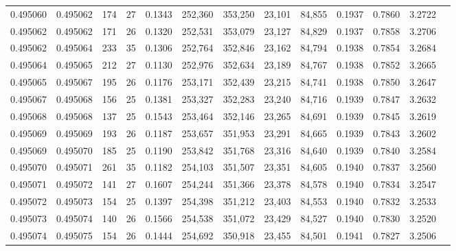\begin{tabular}{rrrrrrrrrrrrr}
0.495060 & 0.495062 & 174 &  27 &                                     0.1343 & 252,360 & 353,250 &  23,101 &  84,855 & 0.1937 & 0.7860 & 3.2722 \\
0.495062 & 0.495062 & 171 &  26 &                                     0.1320 & 252,531 & 353,079 &  23,127 &  84,829 & 0.1937 & 0.7858 & 3.2706 \\
0.495062 & 0.495064 & 233 &  35 &                                     0.1306 & 252,764 & 352,846 &  23,162 &  84,794 & 0.1938 & 0.7854 & 3.2684 \\
0.495064 & 0.495065 & 212 &  27 &                                     0.1130 & 252,976 & 352,634 &  23,189 &  84,767 & 0.1938 & 0.7852 & 3.2665 \\
0.495065 & 0.495067 & 195 &  26 &                                     0.1176 & 253,171 & 352,439 &  23,215 &  84,741 & 0.1938 & 0.7850 & 3.2647 \\
0.495067 & 0.495068 & 156 &  25 &                                     0.1381 & 253,327 & 352,283 &  23,240 &  84,716 & 0.1939 & 0.7847 & 3.2632 \\
0.495068 & 0.495068 & 137 &  25 &                                     0.1543 & 253,464 & 352,146 &  23,265 &  84,691 & 0.1939 & 0.7845 & 3.2619 \\
0.495069 & 0.495069 & 193 &  26 &                                     0.1187 & 253,657 & 351,953 &  23,291 &  84,665 & 0.1939 & 0.7843 & 3.2602 \\
0.495069 & 0.495070 & 185 &  25 &                                     0.1190 & 253,842 & 351,768 &  23,316 &  84,640 & 0.1939 & 0.7840 & 3.2584 \\
0.495070 & 0.495071 & 261 &  35 &                                     0.1182 & 254,103 & 351,507 &  23,351 &  84,605 & 0.1940 & 0.7837 & 3.2560 \\
0.495071 & 0.495072 & 141 &  27 &                                     0.1607 & 254,244 & 351,366 &  23,378 &  84,578 & 0.1940 & 0.7834 & 3.2547 \\
0.495072 & 0.495073 & 154 &  25 &                                     0.1397 & 254,398 & 351,212 &  23,403 &  84,553 & 0.1940 & 0.7832 & 3.2533 \\
0.495073 & 0.495074 & 140 &  26 &                                     0.1566 & 254,538 & 351,072 &  23,429 &  84,527 & 0.1940 & 0.7830 & 3.2520 \\
0.495074 & 0.495075 & 154 &  26 &                                     0.1444 & 254,692 & 350,918 &  23,455 &  84,501 & 0.1941 & 0.7827 & 3.2506 \\

\end{tabular}
